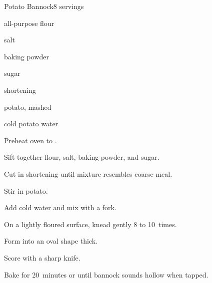 \begin{recipe}{Potato Bannock}{}{8 servings}

\begin{ingredients}
\item \C{2\third} all-purpose flour
\item {} salt
\item {} baking powder
\item {} sugar
\item {} shortening
\item \C{\threequarter} potato, mashed
\item {} cold potato water
\end{ingredients}

\begin{directions}
\item Preheat oven to .
\item Sift together flour, salt, baking powder, and sugar.
\item Cut in shortening until mixture resembles coarse meal.
\item Stir in potato.
\item Add cold water and mix with a fork.
\item On a lightly floured surface, knead gently 8 to 10~times.
\item Form into an oval shape \inch{\threequarter} thick.
\item Score with a sharp knife.
\item Bake for 20~minutes or until bannock sounds hollow when tapped.  
\end{directions}

\end{recipe}
